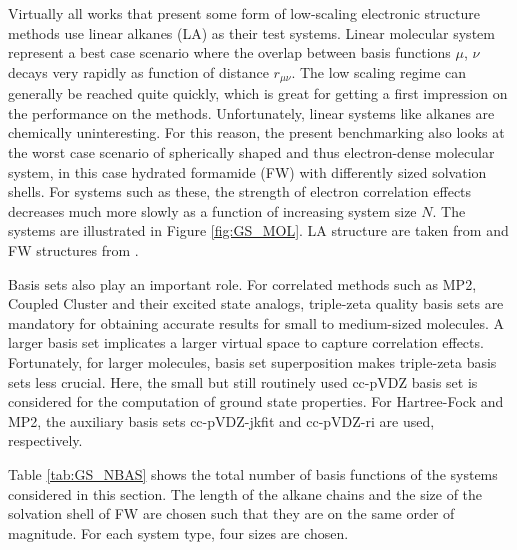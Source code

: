 Virtually all works that present some form of low-scaling electronic structure methods use linear alkanes (LA) as their test systems. Linear molecular system represent a best case scenario where the overlap between basis functions $\mu$, $\nu$ decays very rapidly as function of distance $r_{\mu\nu}$. The low scaling regime can generally be reached quite quickly, which is great for getting a first impression on the performance on the methods. Unfortunately, linear systems like alkanes are chemically uninteresting. For this reason, the present benchmarking also looks at the worst case scenario of spherically shaped and thus electron-dense molecular system, in this case hydrated formamide (FW) with differently sized solvation shells. For systems such as these, the strength of electron correlation effects decreases much more slowly as a function of increasing system size $N$. The systems are illustrated in Figure \ref{fig:GS_MOL}. LA structure are taken from \cite{Och2021} and FW structures from \cite{Bau2017}.

Basis sets also play an important role. For correlated methods such as MP2, Coupled Cluster and their excited state analogs, triple-zeta quality basis sets are mandatory for obtaining accurate results for small to medium-sized molecules. A larger basis set implicates a larger virtual space to capture correlation effects. Fortunately, for larger molecules, basis set superposition makes triple-zeta basis sets less crucial. Here, the small but still routinely used cc-pVDZ basis set is considered for the computation of ground state properties. For Hartree-Fock and MP2, the auxiliary basis sets cc-pVDZ-jkfit and cc-pVDZ-ri are used, respectively.

Table \ref{tab:GS_NBAS} shows the total number of basis functions of the systems considered in this section. The length of the alkane chains and the size of the solvation shell of FW are chosen such that they are on the same order of magnitude. For each system type, four sizes are chosen.

